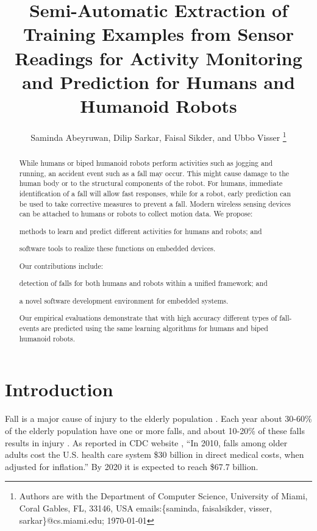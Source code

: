 \documentclass{IEEEtran}
\title{Semi-Automatic Extraction of  Training Examples from Sensor Readings for Activity Monitoring and Prediction for Humans and Humanoid Robots}
\author{{Saminda Abeyruwan}, {Dilip Sarkar}, {Faisal Sikder},   and {Ubbo Visser}
\thanks{ Authors are with
 the
Department of Computer Science, University of Miami,
  Coral Gables, FL, 33146, USA
{ emails:\{saminda, faisalsikder, visser, sarkar\}@cs.miami.edu};
\today} }
\begin{document}
\maketitle

\begin{abstract}
While humans or biped humanoid robots perform activities such as jogging and running, an accident 
event such as a fall may occur. This might cause damage to the human body or 
to the structural components of the robot. For humans, immediate identification of a fall 
will allow fast responses, while for a robot, early prediction can be used to take corrective 
measures to prevent a fall. Modern wireless sensing devices can be attached to humans or robots to 
collect motion data. We propose: \begin{inparaenum}[($i$)] \item 
methods to learn and predict different activities for humans and robots; and \item software 
tools to realize these functions  on embedded devices. \end{inparaenum} Our contributions include: 
\begin{inparaenum}[($i$)] \item detection of falls for both humans and robots within a unified 
framework; and \item  a  novel software development environment for embedded systems. 
\end{inparaenum} Our empirical evaluations demonstrate that with high accuracy different types of  
fall-events are predicted using the same learning algorithms for humans and biped humanoid robots. 

\end{abstract}

\tableofcontents

\section{Introduction}
\label{sec:Intro}
Fall is a major cause of injury to the elderly population \cite{Rubenstein2006}. 
Each year about 30-60\% of the elderly population have one or more falls, and  about 10-20\% of these falls results in injury \cite{Rubenstein2006}. 
As reported in CDC website \cite{CDC2014July},
``In 2010, falls among older adults cost the U.S. health care system \$30 billion in direct medical costs, when adjusted for inflation.'' By 2020 it is expected to reach \$67.7 billion. 
\end{document}
